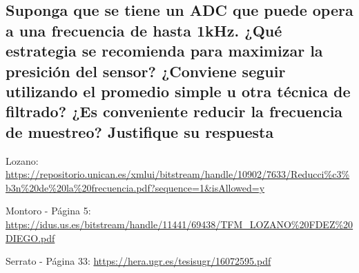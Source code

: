 \documentclass[letterpaper,10.5pt]{article} %
\begin{document}
		\subsection{Suponga que se tiene un ADC que puede opera a una frecuencia de hasta 1kHz. ¿Qué estrategia se recomienda para maximizar la presición del sensor? ¿Conviene seguir utilizando el promedio simple u otra técnica de filtrado? ¿Es conveniente reducir la frecuencia de muestreo? Justifique su respuesta}
		Lozano: \url{https://repositorio.unican.es/xmlui/bitstream/handle/10902/7633/Reducci%c3%b3n%20de%20la%20frecuencia.pdf?sequence=1&isAllowed=y}

		Montoro - Página 5: \url{https://idus.us.es/bitstream/handle/11441/69438/TFM_LOZANO%20FDEZ%20DIEGO.pdf}

		Serrato - Página 33: \url{https://hera.ugr.es/tesisugr/16072595.pdf}

	\hfill \break %
	
\end{document}
